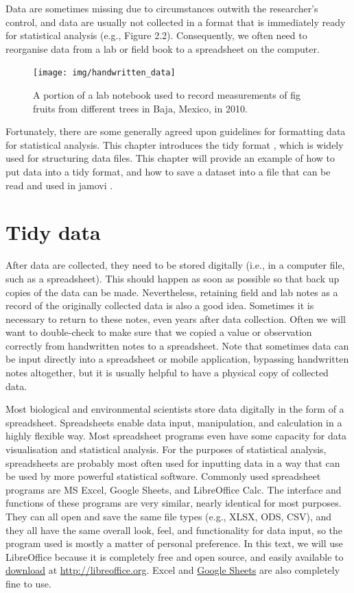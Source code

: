 \documentclass[
]{scrbook}
\begin{document}
Data are sometimes missing due to circumstances outwith the researcher's control, and data are usually not collected in a format that is immediately ready for statistical analysis (e.g., Figure 2.2).
Consequently, we often need to reorganise data from a lab or field book to a spreadsheet on the computer.

\begin{figure}
\texttt{[image: img/handwritten\_data]} \caption{A portion of a lab notebook used to record measurements of fig fruits from different trees in Baja, Mexico, in 2010.}\label{fig:unnamed-chunk-4}
\end{figure}

Fortunately, there are some generally agreed upon guidelines for formatting data for statistical analysis.
This chapter introduces the tidy format \citep{Wickham2014}, which is widely used for structuring data files.
This chapter will provide an example of how to put data into a tidy format, and how to save a dataset into a file that can be read and used in jamovi \citep{Jamovi2022}.

\hypertarget{tidy-data}{%
\section{Tidy data}\label{tidy-data}}

After data are collected, they need to be stored digitally (i.e., in a computer file, such as a spreadsheet).
This should happen as soon as possible so that back up copies of the data can be made.
Nevertheless, retaining field and lab notes as a record of the originally collected data is also a good idea.
Sometimes it is necessary to return to these notes, even years after data collection.
Often we will want to double-check to make sure that we copied a value or observation correctly from handwritten notes to a spreadsheet.
Note that sometimes data can be input directly into a spreadsheet or mobile application, bypassing handwritten notes altogether, but it is usually helpful to have a physical copy of collected data.

Most biological and environmental scientists store data digitally in the form of a spreadsheet.
Spreadsheets enable data input, manipulation, and calculation in a highly flexible way.
Most spreadsheet programs even have some capacity for data visualisation and statistical analysis.
For the purposes of statistical analysis, spreadsheets are probably most often used for inputting data in a way that can be used by more powerful statistical software.
Commonly used spreadsheet programs are MS Excel, Google Sheets, and LibreOffice Calc.
The interface and functions of these programs are very similar, nearly identical for most purposes.
They can all open and save the same file types (e.g., XLSX, ODS, CSV), and they all have the same overall look, feel, and functionality for data input, so the program used is mostly a matter of personal preference.
In this text, we will use LibreOffice because it is completely free and open source, and easily available to \href{https://www.libreoffice.org/download/download-libreoffice/}{download} at \url{http://libreoffice.org}.
Excel and \href{https://docs.google.com/spreadsheets}{Google Sheets} are also completely fine to use.
\end{document}
